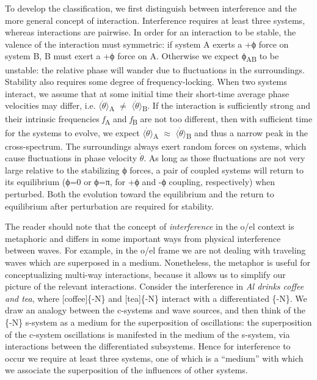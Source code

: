   To develop the classification, we first distinguish between interference and the more general concept of interaction. Interference requires at least three systems, whereas interactions are pairwise. In order for an interaction to be stable, the valence of the interaction must symmetric: if system A exerts a +ϕ force on system B, B must exert a +ϕ force on A. Otherwise we expect ϕ\textsubscript{AB} to be unstable: the relative phase will wander due to fluctuations in the surroundings. Stability also requires some degree of frequency-locking. When two systems interact, we assume that at some initial time their short-time average phase velocities may differ, i.e. $\langle\dot{\theta}\rangle$\textsubscript{A} ${\neq}$ $\langle\dot{\theta}\rangle$\textsubscript{B}. If the interaction is sufficiently strong and their intrinsic frequencies \textit{f}\textsubscript{A} and \textit{f}\textsubscript{B} are not too different, then with sufficient time for the systems to evolve, we expect $\langle\dot{\theta}\rangle$\textsubscript{A} ${\approx}$ $\langle\dot{\theta}\rangle$\textsubscript{B} and thus a narrow peak in the cross-spectrum. The surroundings always exert random forces on systems, which cause fluctuations in phase velocity $\dot{\theta}$. As long as those fluctuations are not very large relative to the stabilizing ϕ forces, a pair of coupled systems will return to its equilibrium (ϕ=0 or ϕ=π, for +ϕ and -ϕ coupling, respectively) when perturbed. Both the evolution toward the equilibrium and the return to equilibrium after perturbation are required for stability.

  The reader should note that the concept of \textit{interference} in the o/el context is metaphoric and differs in some important ways from physical interference between waves. For example, in the o/el frame we are not dealing with traveling waves which are superposed in a medium. Nonetheless, the metaphor is useful for conceptualizing multi-way interactions, because it allows us to simplify our picture of the relevant interactions. Consider the interference in \textit{Al drinks coffee and tea}, where [coffee]\{-N\} and [tea]\{-N\} interact with a differentiated \{-N\}. We draw an analogy between the c-systems and wave sources, and then think of the \{-N\} s-system as a medium for the superposition of oscillations: the superposition of the c-system oscillations is manifested in the medium of the s-system, via interactions between the differentiated subsystems. Hence for interference to occur we require at least three systems, one of which is a “medium” with which we associate the superposition of the influences of other systems. 

